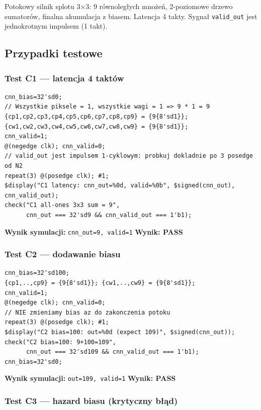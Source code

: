 \documentclass[12pt,a4paper]{article}
\begin{document}
Potokowy silnik splotu 3×3: 9 równoległych mnożeń, 2-poziomowe drzewo sumatorów, finalna akumulacja z biasem. Latencja 4 takty. Sygnał \texttt{valid\_out} jest jednokrotnym impulsem (1 takt).

\subsection{Przypadki testowe}

\subsubsection*{Test C1 — latencja 4 taktów}

\begin{lstlisting}
cnn_bias=32'sd0;
// Wszystkie piksele = 1, wszystkie wagi = 1 => 9 * 1 = 9
{cp1,cp2,cp3,cp4,cp5,cp6,cp7,cp8,cp9} = {9{8'sd1}};
{cw1,cw2,cw3,cw4,cw5,cw6,cw7,cw8,cw9} = {9{8'sd1}};
cnn_valid=1;
@(negedge clk); cnn_valid=0;
// valid_out jest impulsem 1-cyklowym: probkuj dokladnie po 3 posedge od N2
repeat(3) @(posedge clk); #1;
$display("C1 latency: cnn_out=%0d, valid=%0b", $signed(cnn_out), cnn_valid_out);
check("C1 all-ones 3x3 sum = 9",
      cnn_out === 32'sd9 && cnn_valid_out === 1'b1);
\end{lstlisting}

\textbf{Wynik symulacji:} \texttt{cnn\_out=9, valid=1} \quad \textbf{Wynik: PASS}

\subsubsection*{Test C2 — dodawanie biasu}

\begin{lstlisting}
cnn_bias=32'sd100;
{cp1,..,cp9} = {9{8'sd1}}; {cw1,..,cw9} = {9{8'sd1}};
cnn_valid=1;
@(negedge clk); cnn_valid=0;
// NIE zmieniamy bias az do zakonczenia potoku
repeat(3) @(posedge clk); #1;
$display("C2 bias=100: out=%0d (expect 109)", $signed(cnn_out));
check("C2 bias=100: 9+100=109",
      cnn_out === 32'sd109 && cnn_valid_out === 1'b1);
cnn_bias=32'sd0;
\end{lstlisting}

\textbf{Wynik symulacji:} \texttt{out=109, valid=1} \quad \textbf{Wynik: PASS}

\subsubsection*{Test C3 — hazard biasu (krytyczny błąd)}
\end{document}

